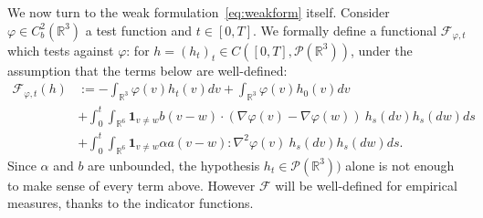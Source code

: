 \documentclass[11pt,a4paper]{article}
\theoremstyle{definition}
\theoremstyle{plain}
\begin{document}
We now turn to the weak formulation~\eqref{eq:weakform} itself. Consider $\varphi\in C^2_b(\mathbb{R}^3)$ a test function and $t\in[0,T]$. We formally define a functional $\mathcal{F}_{\varphi,t}$ which tests against $\varphi$: for $h=(h_t)_t\in C([0,T],\mathcal{P}(\mathbb{R}^3))$, under the assumption that the terms below are well-defined:
    \begin{align}
    \label{eq:def_f}
    \mathcal{F}_{\varphi,t}(h) &:=  -\int_{\mathbb{R}^3} \varphi(v)h_t(v)dv + \int_{\mathbb{R}^3} \varphi(v)h_0(v)dv \nonumber\\
    &+ \int_0^t \int_{\mathbb{R}^6} \mathbf{1}_{v\neq w}b(v-w) \cdot (\nabla\varphi(v)-\nabla\varphi(w))\ h_s(dv)h_s(dw) ds\\
    &+ \int_0^t \int_{\mathbb{R}^6} \mathbf{1}_{v\neq w}\alpha a(v-w):\nabla^2\varphi(v)\ h_s(dv)h_s(dw) ds.\nonumber
    \end{align}
Since $\alpha$ and $b$ are unbounded, the hypothesis $h_t \in \mathcal{P}(\mathbb{R}^3))$ alone is not enough to make sense of every term above.  However $\mathcal{F}$ will be well-defined for empirical measures, thanks to the indicator functions.
\end{document}
